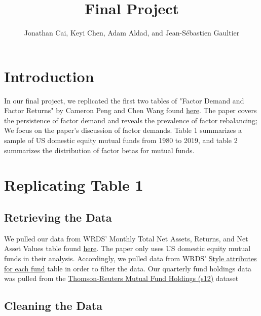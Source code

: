 \documentclass{article}
\title{Final Project}
\author{Jonathan Cai, Keyi Chen, Adam Aldad, and Jean-Sébastien Gaultier}
\begin{document}
\maketitle
 
\section{Introduction}

In our final project, we replicated the first two tables of "Factor Demand and Factor Returns" by Cameron Peng and Chen Wang found \href{https://papers.ssrn.com/sol3/papers.cfm?abstract_id=3327849}{here}. The paper covers the persistence of factor demand and reveals the prevalence of factor rebalancing; We focus on the paper's discussion of factor demands. Table 1 summarizes a sample of US domestic equity mutual funds from 1980 to 2019, and table 2 summarizes the distribution of factor betas for mutual funds. 

\section{Replicating Table 1}

\subsection{Retrieving the Data}

We pulled our data from WRDS' Monthly Total Net Assets, Returns, and Net Asset Values table found \href{https://wrds-www.wharton.upenn.edu/data-dictionary/crsp_q_mutualfunds/monthly_tna_ret_nav/}{here}. The paper only uses US domestic equity mutual funds in their analysis. Accordingly, we pulled data from WRDS' \href{https://wrds-www.wharton.upenn.edu/data-dictionary/crsp_q_mutualfunds/fund_style/}{Style attributes for each fund} table in order to filter the data. Our quarterly fund holdings data was pulled from the \href{https://wrds-www.wharton.upenn.edu/data-dictionary/tr_mutualfunds/s12/}{Thomson-Reuters Mutual Fund Holdings (s12)} dataset

\subsection{Cleaning the Data}
\end{document}
